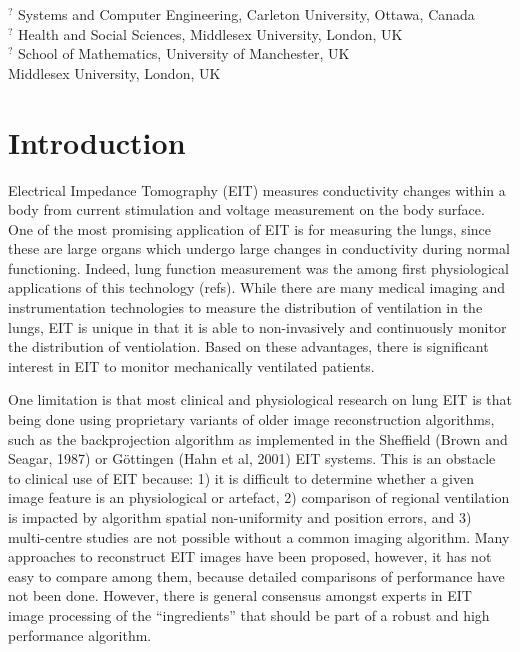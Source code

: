 \documentclass[letterpaper,twocolumn,11pt]{article}
\begin{document}

{\small
\noindent $^?$ Systems and Computer Engineering,
               Carleton University, Ottawa, Canada \\
\noindent $^?$ Health and Social Sciences,
               Middlesex University, London, UK \\
\noindent $^?$ School of Mathematics,
               University of Manchester, UK \\
               Middlesex University, London, UK \\
}

\section{Introduction}
Electrical Impedance Tomography (EIT) measures conductivity
changes within a body from current stimulation and voltage
measurement on the body surface. One of the most promising
application of EIT is for measuring the lungs, since these
are large organs which undergo large changes in conductivity
during normal functioning. Indeed, lung function measurement
was the among first physiological applications of this technology
(refs). While there are many medical imaging and instrumentation
technologies to measure the distribution of ventilation
in the lungs, EIT is unique in that it
is able to non-invasively and continuously monitor the distribution of 
ventiolation. Based on these advantages, there is significant
interest in EIT to 
monitor mechanically ventilated patients.

One limitation is that most clinical and physiological research
on lung EIT is that being done using proprietary variants of
older image reconstruction algorithms, such as the backprojection
algorithm as implemented
in the Sheffield (Brown and Seagar, 1987)
or G\"ottingen (Hahn et al, 2001) EIT systems.
This is an obstacle to clinical use of EIT because:
1) it is difficult to determine whether a given image feature is 
an physiological or artefact,
2) comparison of regional ventilation is impacted by
algorithm spatial non-uniformity and position errors,
and 
3) multi-centre studies are not possible without a 
common imaging algorithm.
Many approaches to reconstruct EIT images have been proposed,
however, it has not easy to compare among them, because 
detailed comparisons of performance have not been done. 
However, there is general consensus amongst experts
in EIT image processing of the ``ingredients'' that should
be part of a robust and high performance algorithm.
\end{document}
